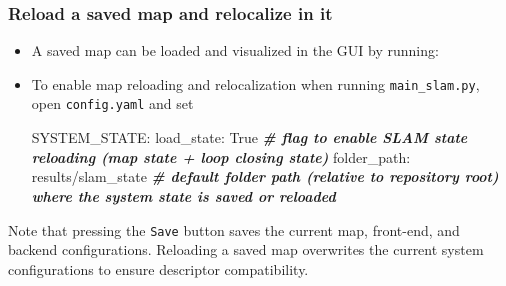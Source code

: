 \documentclass{article}
\newenvironment{Shaded}{\begin{snugshade}}{\end{snugshade}}
\newcommand{\BuiltInTok}[1]{\textcolor[rgb]{0.74,0.68,0.62}{#1}}
\newcommand{\CommentTok}[1]{\textcolor[rgb]{0.00,0.40,1.00}{\textbf{\textit{#1}}}}
\newcommand{\ExtensionTok}[1]{\textcolor[rgb]{0.74,0.68,0.62}{#1}}
\newcommand{\NormalTok}[1]{\textcolor[rgb]{0.74,0.68,0.62}{#1}}
\begin{document}
\hypertarget{reload-a-saved-map-and-relocalize-in-it}{%
\subsubsection{Reload a saved map and relocalize in
it}\label{reload-a-saved-map-and-relocalize-in-it}}

\begin{itemize}
\item
  A saved map can be loaded and visualized in the GUI by running: \\

\begin{scriptsize}
\begin{Shaded}
\end{Shaded}

\end{scriptsize}

\item
  To enable map reloading and relocalization when running
  \texttt{main\_slam.py}, open \texttt{config.yaml} and set \\

\begin{scriptsize}
\begin{Shaded}
\begin{Highlighting}[]
\ExtensionTok{SYSTEM_STATE}\NormalTok{:}
  \ExtensionTok{load_state}\NormalTok{: True                  }\CommentTok{# flag to enable SLAM state reloading (map state + loop closing state)}
  \ExtensionTok{folder_path}\NormalTok{: results/slam_state   }\CommentTok{# default folder path (relative to repository root) where the system state is saved or reloaded}
\end{Highlighting}
\end{Shaded}
\end{scriptsize}

\end{itemize}

Note that pressing the \texttt{Save} button saves the current map,
front-end, and backend configurations. Reloading a saved map overwrites
the current system configurations to ensure descriptor compatibility.
\end{document}
